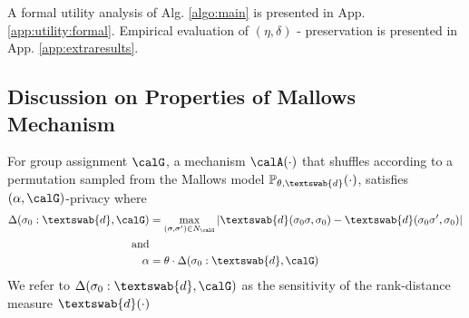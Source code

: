 A formal utility analysis of Alg. \ref{algo:main} is presented in App. \ref{app:utility:formal}. Empirical evaluation of $(\eta,\delta)$ - preservation is presented in App. \ref{app:extraresults}. 
\subsection{Discussion on Properties of Mallows Mechanism}\label{app:prop}

\begin{prope}
\label{prop:1}
For group assignment $\calG$, a  mechanism $\calA(\cdot)$ that shuffles according to a permutation sampled from the Mallows model $\mathbb{P}_{\theta,\textswab{d}}(\cdot)$, satisfies $(\alpha, \calG)$-\name privacy where
\begin{align*}
 \Delta(\sigma_0 : \textswab{d}, \calG) &= \max_{(\sigma, \sigma') \in N_\calG} |\textswab{d}(\sigma_0 \sigma, \sigma_0) - \textswab{d}(\sigma_0 \sigma', \sigma_0)|\\
 \text{and}&\\
    \alpha 
    &= \theta \cdot \Delta(\sigma_0 : \textswab{d}, \calG)
\end{align*} 
We refer to $\Delta(\sigma_0 : \textswab{d}, \calG) $ as the sensitivity of the rank-distance measure $\textswab{d}(\cdot)$
\end{prope}
